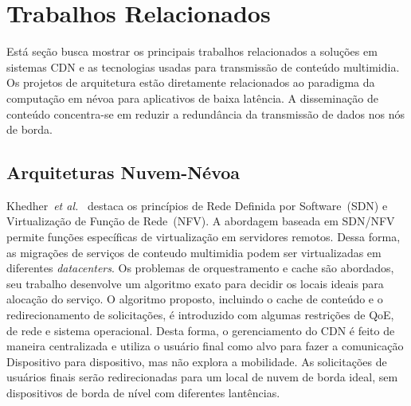 \section{Trabalhos Relacionados}
\label{ch:related-work}

Está seção busca mostrar os principais trabalhos relacionados a soluções em sistemas CDN e as tecnologias usadas para transmissão de conteúdo multimidia. 
Os projetos de arquitetura estão diretamente relacionados ao paradigma da computação em névoa para aplicativos de baixa latência. A disseminação de conteúdo concentra-se em reduzir a redundância da transmissão de dados nos nós de borda.



\subsection{Arquiteturas Nuvem-Névoa}
\label{subsec:arch-cloud-fog}
Khedher~\textit{et al.}~\cite{khedherComNet2017, khedherLCN2017} destaca os princípios de Rede Definida por Software~(SDN) e Virtualização de Função de Rede~(NFV). A abordagem baseada em SDN/NFV permite funções específicas de virtualização em servidores remotos. Dessa forma, as migrações de serviços de conteudo multimidia podem ser virtualizadas em diferentes \textit{datacenters}. Os problemas de orquestramento e cache são abordados, seu trabalho desenvolve um algoritmo exato para decidir os locais ideais para alocação do serviço. O algoritmo proposto, incluindo o cache de conteúdo e o redirecionamento de solicitações, é introduzido com algumas restrições de QoE, de rede e sistema operacional. 
Desta forma, o gerenciamento do CDN é feito de maneira centralizada e utiliza o usuário final como alvo para fazer a comunicação Dispositivo para dispositivo, mas não explora a mobilidade. As solicitações de usuários finais serão redirecionadas para um local de nuvem de borda ideal, sem dispositivos de borda de nível com diferentes lantências. 

